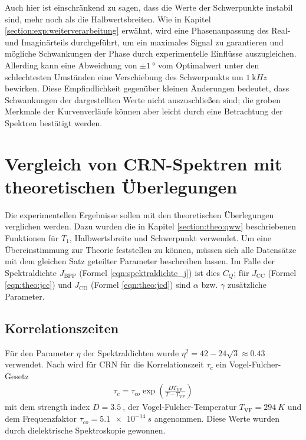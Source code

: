 Auch hier ist einschränkend zu sagen, dass die Werte der Schwerpunkte instabil sind, mehr noch als die Halbwertsbreiten. Wie in Kapitel \ref{section:exp:weiterverarbeitung} erwähnt, wird eine Phasenanpassung des Real- und Imaginärteils durchgeführt, um ein maximales Signal zu garantieren und mögliche Schwankungen der Phase durch experimentelle Einflüsse auszugleichen. Allerding kann eine Abweichung von $\pm \SI{1}{\degree}$ vom Optimalwert unter den schlechtesten Umständen eine Verschiebung des Schwerpunkts um $\SI{1}{\kilo Hz}$ bewirken. Diese Empfindlichkeit gegenüber kleinen Änderungen bedeutet, dass Schwankungen der dargestellten Werte nicht auszuschließen sind; die groben Merkmale der Kurvenverläufe können aber leicht durch eine Betrachtung der Spektren bestätigt werden.




\section{Vergleich von CRN-Spektren mit theoretischen Überlegungen} \label{section:res:theorie}

Die experimentellen Ergebnisse sollen mit den theoretischen Überlegungen verglichen werden. Dazu wurden die in Kapitel \ref{section:theo:qww} beschriebenen Funktionen für $T_1$, Halbwertsbreite und Schwerpunkt verwendet. Um eine Übereinstimmung zur Theorie feststellen zu können, müssen sich alle Datensätze mit dem gleichen Satz geteilter Parameter beschreiben lassen. Im Falle der Spektraldichte $J_\text{BPP}$ (Formel \eqref{eqn:spektraldichte_j}) ist dies $C_Q$; für $J_\text{CC}$ (Formel \eqref{eqn:theo:jcc}) und $J_\text{CD}$ (Formel \eqref{eqn:theo:jcd}) sind $\alpha$ bzw. $\gamma$ zusätzliche Parameter.


\subsection{Korrelationszeiten} \label{sub:res:tauc}

Für den Parameter $\eta$ der Spektraldichten wurde $\eta^2 = 42 - 24 \sqrt{3} \approx \SI{0.43}{}$ \cite{caer} verwendet. Nach \cite{PIMENOV199793} wird für CRN für die Korrelationszeit $\tau_c$ ein Vogel-Fulcher-Gesetz
\begin{align}
	\tau_c = \tau_{co} \exp \left( \frac{D T_\text{VF}}{T-T_\text{VF}} \right)
\end{align}
mit dem strength index $D = \SI{3.5}{}$, der Vogel-Fulcher-Temperatur $T_\text{VF} = \SI{294}{K}$ und dem Frequenzfaktor $\tau_{co} = \SI{5.1e-14}{s}$ angenommen. Diese Werte wurden durch dielektrische Spektroskopie gewonnen.

